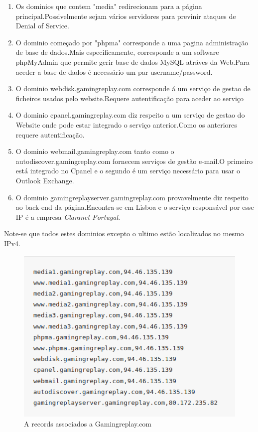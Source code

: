 \begin{enumerate}

\item Os dominios que contem "media" redirecionam para a página principal.Possivelmente sejam vários servidores para previnir ataques de Denial of Service.

\item O dominio começado por "phpma" corresponde a uma pagina administração de base de dados.Mais especificamente, corresponde a um software phpMyAdmin que permite gerir base de dados MySQL atráves da Web.Para aceder a base de dados é necessário um par username/password.

\item O dominio webdisk.gamingreplay.com corresponde á um serviço de gestao de ficheiros usados pelo website.Requere autentificação para aceder ao serviço

\item O dominio cpanel.gamingreplay.com diz respeito a um serviço de gestao do Website onde pode estar integrado o serviço anterior.Como os anteriores requere autentificação.

\item O dominio webmail.gamingreplay.com tanto como o autodiscover.gamingreplay.com fornecem serviços de gestão e-mail.O primeiro está integrado no Cpanel e o segundo é um serviço necessário para usar o Outlook Exchange.

\item O dominio gamingreplayserver.gamingreplay.com provavelmente diz respeito ao back-end da página.Encontra-se em Lisboa e o serviço responsável por esse IP é a empresa \emph{Claranet Portugal}.

\end{enumerate}

Note-se que todos estes dominios excepto o ultimo estão localizados no mesmo IPv4.

\begin{figure}[h!]
\caption{A records associados a Gamingreplay.com}
\includegraphics{Images/DNSArecords.png}
\end{figure}

